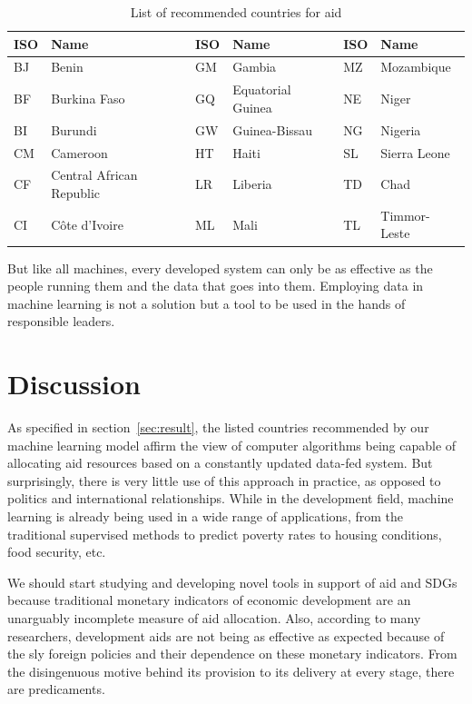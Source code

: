 \documentclass{swfuthesise}
\begin{document}
\begin{table}[ht]
  \centering\singlespacing%
  \caption{List of recommended countries for aid\label{tab:sc012}}
  \begin{tabular}{llllll}
    \toprule
    ISO&Name                    &ISO&Name             &ISO&Name        \\\midrule
    BJ &Benin                   &GM &Gambia           &MZ &Mozambique  \\
    BF &Burkina Faso            &GQ &Equatorial Guinea&NE &Niger       \\
    BI &Burundi                 &GW &Guinea-Bissau    &NG &Nigeria     \\  
    CM &Cameroon                &HT &Haiti            &SL &Sierra Leone\\           
    CF &Central African Republic&LR &Liberia          &TD &Chad        \\           
    CI &Côte d'Ivoire           &ML &Mali             &TL &Timmor-Leste\\\bottomrule
  \end{tabular}
\end{table}

But like all machines, every developed system can only be as effective as the people
running them and the data that goes into them. Employing data in machine learning is not a
solution but a tool to be used in the hands of responsible leaders.

\section{Discussion}
As specified in section~\ref{sec:result}, the listed countries recommended by our machine learning model affirm the view of computer algorithms being capable of allocating aid resources based on a constantly updated data-fed system. But surprisingly, there is very little use of this approach in practice, as opposed to politics and international relationships. While in the development field, machine learning is already being used in a wide range of applications, from the traditional supervised methods to predict poverty rates to housing conditions, food security, etc. 

We should start studying and developing novel tools in support of aid and SDGs because traditional monetary indicators of economic development are an unarguably incomplete measure of aid allocation. Also, according to many researchers, development aids are not being as effective as expected because of the sly foreign policies and their dependence on these monetary indicators. From the disingenuous motive behind its provision to its delivery at every stage, there are predicaments. 
\end{document}
